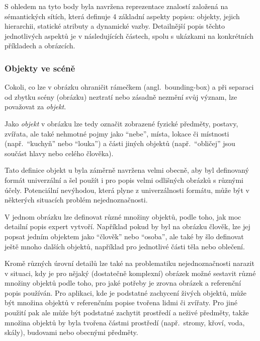 
S ohledem na tyto body byla navržena reprezentace znalostí založená na sémantických sítích, která definuje 4 základní aspekty popisu: objekty, jejich hierarchii,
statické atributy a dynamické vazby.
Detailnější popis těchto jednotlivých aspektů je v následujících částech, spolu s ukázkami na konkrétních příkladech a obrázcích.

\subsubsection*{Objekty ve scéně}
\newcommand{\objekt}{{\color{red!70!black}\texttt{objekt}}}
Cokoli, co lze v obrázku ohraničit rámečkem (angl.~bounding-box) a při separaci od zbytku scény (obrázku) neztratí nebo zásadně nezmění svůj význam,
lze považovat za \emph{objekt}.

Jako \emph{objekt} v obrázku lze tedy označit zobrazené fyzické předměty, postavy, zvířata, ale také nehmotné pojmy jako \enquote{nebe},
místa, lokace či místnosti (např.~\enquote{kuchyň} nebo \enquote{louka}) a části jiných objektů (např.~\enquote{obličej} jsou součást hlavy nebo celého člověka).

Tato definice objekt u byla záměrně navržena velmi obecně, aby byl definovaný formát univerzální a šel použít i pro popis velmi odlišných obrázků s různými účely.
Potenciální nevýhodou, která plyne z univerzálnosti formátu, může být v některých situacích problém nejednoznačnosti.

V jednom obrázku lze definovat různé množiny objektů, podle toho, jak moc detailní popis expert vytvoří.
Například pokud by byl na obrázku člověk, lze jej popsat jedním objektem jako \enquote{člověk} nebo \enquote{osoba},
ale také by šlo definovat ještě mnoho dalších objektů, například pro jednotlivé části těla nebo oblečení.

Kromě různých úrovní detailů lze také na problematiku nejednoznačnosti narazit v situaci, kdy je pro nějaký (dostatečně komplexní) obrázek
možné sestavit různé množiny objektů podle toho, pro jaké potřeby je zrovna obrázek a referenční popis používán.
Pro aplikaci, kde je podstatné zachycení živých objektů, může být množina objektů v referenčním popise tvořena lidmi či zvířaty.
Pro jiné použití pak ale může být podstatné zachytit prostředí a neživé předměty,
takže množina objektů by byla tvořena částmi prostředí (např.~stromy, křoví, voda, skály), budovami nebo obecnými předměty.

